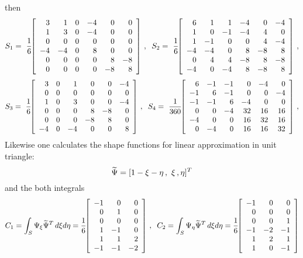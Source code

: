 \documentclass[12pt,a4paper,USenglish,twoside]{book}
\begin{document}
then
\[
S_1 = \ \frac16\,\ba{[}{rrrrrr}
      3 & 1 & 0 & -4 & 0 & 0\\
     1 & 3 & 0 & -4 & 0 & 0\\
     0 & 0 & 0 & 0 & 0 & 0\\
     -4 & -4 & 0 & 8 & 0 & 0\\
     0 & 0 & 0 & 0 & 8 & -8\\
     0 & 0 & 0 & 0 & -8 & 8\ea{]}\,, \;\;
%
S_2 = \ \frac16\,\ba{[}{rrrrrr}
      6 & 1 & 1 & -4 & 0 &-4\\
     1 & 0 &-1 & -4 & 4 & 0\\
     1 &-1 & 0 & 0 & 4 &-4\\
     -4 & -4 & 0 & 8 &-8 & 8\\
     0 & 4 & 4 &-8 & 8 & -8\\
    -4 & 0 &-4 & 8 & -8 & 8\ea{]}\,,
\]
\[
S_3 = \ \frac16\,\ba{[}{rrrrrr}
      3 & 0 & 1 & 0 & 0 & -4\\
     0 & 0 & 0 &  0 & 0 & 0\\
     1 & 0 & 3 & 0 & 0 &-4\\
     0 & 0 & 0 & 8 &-8 & 0\\
     0 & 0 & 0 &-8 & 8 &  0\\
    -4 & 0 &-4 & 0 &0 & 8\ea{]}\,, \;\;
%
S_4 = \ \frac{1}{360}\,\ba{[}{rrrrrr}
      6 &-1 &-1 &  0 &-4 & 0\\
    -1 & 6 &-1 &  0 & 0 &-4\\
    -1 &-1 & 6 &-4 & 0 & 0\\
     0 &  0 &-4 &32 &16 &16\\
    -4 & 0 & 0 &16 &32 & 16\\
     0 &-4 & 0 &16 & 16 &32\ea{]}\,,
\]
Likewise one calculates the shape functions for linear approximation in unit triangle:
\[
\widetilde{\Psi} = [1 - \xi -\eta\,, \ \xi\,, \eta]^T
\]
and the both integrals
 \[
C_1 = \int_S\Psi_{\xi}\wi{\Psi}^T\, d\xi d\eta
= \frac16 \, \ba{[}{rrr}
 -1 & 0&  0\\
  0 & 1&  0\\
  0 & 0&  0\\
  1 &-1&  0\\
  1 & 1&  2\\
 -1 &-1& -2\ea{]}\,,\;\;
%
C_2 = \int_S\Psi_{\eta}\wi{\Psi}^T\, d\xi d\eta
= \frac16 \, \ba{[}{rrr}
 -1&  0&  0\\
  0&  0&  0\\
  0&  0&  1\\
 -1& -2& -1\\
  1&  2&  1\\
  1&  0& -1\ea{]}
\]
\end{document}
